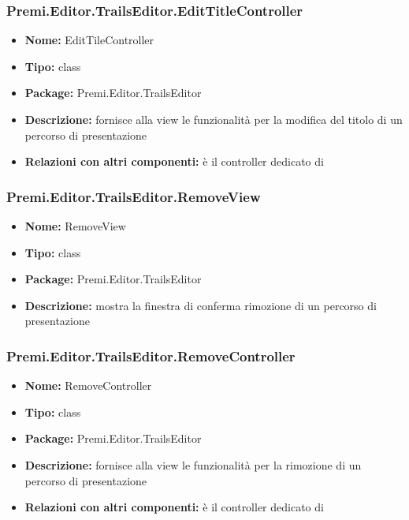 \subsubsection{Premi.Editor.TrailsEditor.EditTitleController}
\begin{itemize}
  \item \textbf{Nome:} EditTileController
  \item \textbf{Tipo:} class
  \item \textbf{Package:} Premi.Editor.TrailsEditor
  \item \textbf{Descrizione:} fornisce alla view le funzionalità per la modifica del titolo di un percorso di presentazione
  \item \textbf{Relazioni con altri componenti:} è il controller dedicato di   
\end{itemize}
\subsubsection{Premi.Editor.TrailsEditor.RemoveView}
\begin{itemize}
  \item \textbf{Nome:} RemoveView
  \item \textbf{Tipo:} class
  \item \textbf{Package:} Premi.Editor.TrailsEditor
  \item \textbf{Descrizione:} mostra la finestra di conferma rimozione di un percorso di presentazione
\end{itemize}
\subsubsection{Premi.Editor.TrailsEditor.RemoveController}
\begin{itemize}
  \item \textbf{Nome:} RemoveController
  \item \textbf{Tipo:} class
  \item \textbf{Package:} Premi.Editor.TrailsEditor
  \item \textbf{Descrizione:} fornisce alla view le funzionalità per la rimozione di un percorso di presentazione
  \item \textbf{Relazioni con altri componenti:} è il controller dedicato di   
\end{itemize}












